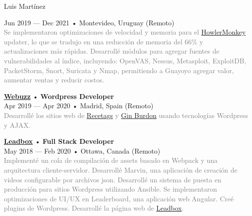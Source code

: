 \documentclass[12pt]{article}
\begin{document}
\begin{cv}{Luis Mart\'inez}
\begin{minipage}[t]{0.55\textwidth}
{      Jun 2019 --- Dec 2021 • Montevideo, Uruguay (Remoto)\\
      \footnotesize{\textcolor{gray}{Se implementaron optimizaciones de velocidad y memoria para el \href{https://howlermonkey.io}{HowlerMonkey} updater, lo que se tradujo en una reducción de memoria del 66\% y actualizaciones más rápidas. Desarrollé módulos para agregar fuentes de vulnerabilidades al índice, incluyendo: OpenVAS, Nessus, Metasploit, ExploitDB, PacketStorm, Snort, Suricata y Nmap, permitiendo a Guayoyo agregar valor, aumentar ventas y reducir costos.}}\\
    }\vspace{0.125em}
    \parbox[t]{\linewidth}{
      \textbf{\href{https://web.archive.org/web/20180413143616/https://webuzz.es/}{Webuzz}} • \textrm{\textbf{Wordpress Developer}}\\
      Apr 2019 --- Apr 2020 • Madrid, Spain (Remoto)\\
      \footnotesize{\textcolor{gray}{Desarrollé los sitios web de \href{https://web.archive.org/web/20201101021046/https://www.recetags.com/}{Recetags} y \href{https://web.archive.org/web/20191206145303/https://www.ginburdon.com/}{Gin Burdon} usando tecnologías Wordpress y AJAX.}}\\
    }\vspace{0.125em}
    \parbox[t]{\linewidth}{
      \textbf{\href{https://leadboxhq.com}{Leadbox}} • \textrm{\textbf{Full Stack Developer}}\\
      May 2018 --- Feb 2020 • Ottawa, Canada (Remoto)\\
      \footnotesize{\textcolor{gray}{Implementé un cola de compilación de assets basado en Webpack y una arquitectura cliente-servidor. Desarrollé Marvin, una aplicación de creación de videos configurable por archivos json. Desarrollé un sistema de puesta en producción para sitios Wordpress utilizando Ansible. Se implementaron optimizaciones de UI/UX en Leaderboard, una aplicación web Angular. Creé plugins de Wordpress. Desarrollé la página web de \href{https://leadboxhq.com}{Leadbox}.}}\\
    }\vspace{0.125em}

\end{minipage}
\end{cv}
\end{document}
